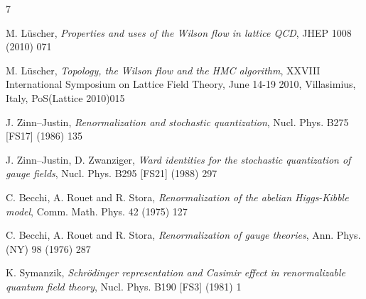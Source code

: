 \begin{thebibliography}{7}


M. L\"uscher,
{\itshape Properties and uses of the Wilson flow in lattice QCD},
JHEP 1008 (2010) 071

M. L\"uscher,
{\itshape Topology, the Wilson flow and the HMC algorithm},
XXVIII International Symposium on Lattice Field Theory, June 14-19 2010, Villasimius, Italy,
PoS(Lattice 2010)015



J. Zinn--Justin,
{\itshape Renormalization and stochastic quantization},
Nucl. Phys. B275 [FS17] (1986) 135

J. Zinn--Justin, D. Zwanziger,
{\itshape Ward identities for the stochastic quantization of gauge fields},
Nucl. Phys. B295 [FS21] (1988) 297



C. Becchi, A. Rouet and R. Stora,
{\itshape Renormalization of the abelian Higgs-Kibble model},
Comm. Math. Phys. 42 (1975) 127

C. Becchi, A. Rouet and R. Stora,
{\itshape Renormalization of gauge theories},
Ann. Phys. (NY) 98 (1976) 287



K. Symanzik,
{\itshape Schr\"odinger representation and Casimir effect in
renormalizable quantum field theory},
Nucl. Phys. B190 [FS3] (1981) 1

\end{thebibliography}
